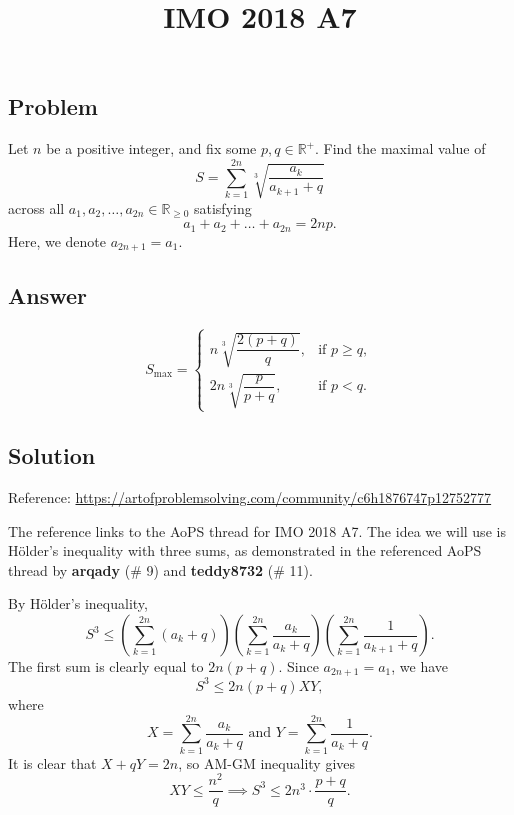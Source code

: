\documentclass{article}
\title{IMO 2018 A7}
\author{}
\date{}
\newcommand{\R}{\mathbb{R}}
\begin{document}
\maketitle



\subsection*{Problem}

Let $n$ be a positive integer, and fix some $p, q \in \R^+$.
Find the maximal value of
\[ S = \sum_{k = 1}^{2n} \sqrt[3]{\frac{a_k}{a_{k + 1} + q}} \]
    across all $a_1, a_2, \ldots, a_{2n} \in \R_{\geq 0}$ satisfying
\[ a_1 + a_2 + \ldots + a_{2n} = 2np. \]
Here, we denote $a_{2n + 1} = a_1$.



\subsection*{Answer}

\[ S_{\max} = \begin{cases}
    n \sqrt[3]{\dfrac{2(p + q)}{q}}, & \text{if } p \geq q, \\
    2n \sqrt[3]{\dfrac{p}{p + q}}, & \text{if } p < q.
\end{cases} \]



\subsection*{Solution}

Reference: \url{https://artofproblemsolving.com/community/c6h1876747p12752777}

The reference links to the AoPS thread for IMO 2018 A7.
The idea we will use is H\"{o}lder's inequality with three sums, as demonstrated in the referenced AoPS thread by \textbf{arqady} (\# 9) and \textbf{teddy8732} (\# 11).

By H\"{o}lder's inequality,
\[ S^3 \leq \left(\sum_{k = 1}^{2n} (a_k + q)\right) \left(\sum_{k = 1}^{2n} \frac{a_k}{a_k + q}\right) \left(\sum_{k = 1}^{2n} \frac{1}{a_{k + 1} + q}\right). \]
The first sum is clearly equal to $2n (p + q)$.
Since $a_{2n + 1} = a_1$, we have
\[ S^3 \leq 2n (p + q) XY, \]
    where
\[ X = \sum_{k = 1}^{2n} \frac{a_k}{a_k + q} \text{ and } Y = \sum_{k = 1}^{2n} \frac{1}{a_k + q}. \]
It is clear that $X + qY = 2n$, so AM-GM inequality gives
\[ XY \leq \frac{n^2}{q} \implies S^3 \leq 2n^3 \cdot \frac{p + q}{q}. \]
\end{document}
